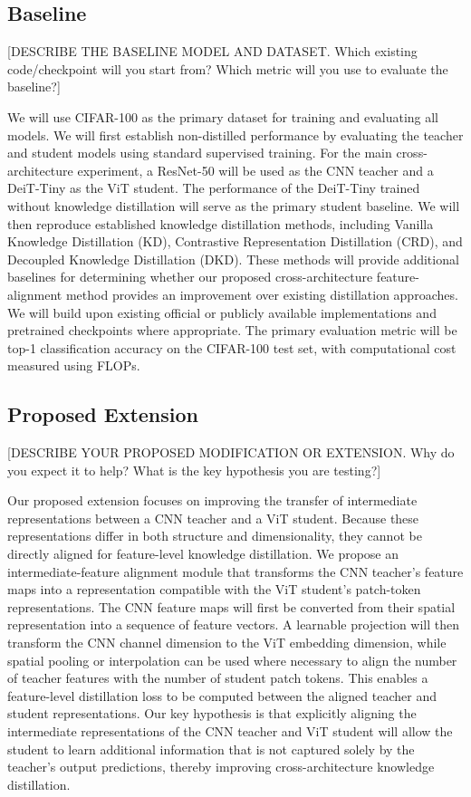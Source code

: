 \documentclass[11pt, letterpaper]{article}
\begin{document}
\subsection{Baseline}

[DESCRIBE THE BASELINE MODEL AND DATASET. Which existing code/checkpoint will
you start from? Which metric will you use to evaluate the baseline?]

We will use CIFAR-100 as the primary dataset for training and evaluating all models. We will first establish non-distilled performance by evaluating the teacher and student models using standard supervised training. For the main cross-architecture experiment, a ResNet-50 will be used as the CNN teacher and a DeiT-Tiny as the ViT student. The performance of the DeiT-Tiny trained without knowledge distillation will serve as the primary student baseline.
We will then reproduce established knowledge distillation methods, including Vanilla Knowledge Distillation (KD), Contrastive Representation Distillation (CRD), and Decoupled Knowledge Distillation (DKD). These methods will provide additional baselines for determining whether our proposed cross-architecture feature-alignment method provides an improvement over existing distillation approaches. We will build upon existing official or publicly available implementations and pretrained checkpoints where appropriate. The primary evaluation metric will be top-1 classification accuracy on the CIFAR-100 test set, with computational cost measured using FLOPs.

\subsection{Proposed Extension}

[DESCRIBE YOUR PROPOSED MODIFICATION OR EXTENSION. Why do you expect it to
help? What is the key hypothesis you are testing?]

Our proposed extension focuses on improving the transfer of intermediate representations between a CNN teacher and a ViT student. Because these representations differ in both structure and dimensionality, they cannot be directly aligned for feature-level knowledge distillation.
We propose an intermediate-feature alignment module that transforms the CNN teacher's feature maps into a representation compatible with the ViT student's patch-token representations. The CNN feature maps will first be converted from their spatial representation into a sequence of feature vectors. A learnable projection will then transform the CNN channel dimension to the ViT embedding dimension, while spatial pooling or interpolation can be used where necessary to align the number of teacher features with the number of student patch tokens. This enables a feature-level distillation loss to be computed between the aligned teacher and student representations.
Our key hypothesis is that explicitly aligning the intermediate representations of the CNN teacher and ViT student will allow the student to learn additional information that is not captured solely by the teacher's output predictions, thereby improving cross-architecture knowledge distillation.
\end{document}
